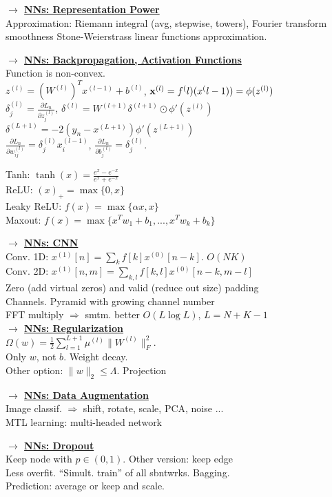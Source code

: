 \documentclass[]{article}
\newcommand{\myvector}[1]{{\bf{#1}}}
\newcommand{\x}{\myvector{x}}
\newcommand{\mytitle}[1]{ {\bf $\rightarrow$ \underline{#1}}\\}
\begin{document}
\begin{multicols*}{2}
\mytitle{NNs: Representation Power}
Approximation: Riemann integral (avg, stepwise, towers), Fourier transform smoothness
Stone-Weierstrass linear functions approximation.

\mytitle{NNs: Backpropagation, Activation Functions}
Function is non-convex.\\
$z^({l})=(W^{(l)})^Tx^{(l-1)}+b^{(l)}$, $\x^{(l)}=f^({l})(x^({l-1}))=\phi(z^{(l)})$\\
$\delta_j^{(l)}=\frac{\partial L_n}{\partial z_j^{(l)}}$, $\delta^{(l)}=W^{(l+1)}\delta^{(l+1)}\odot \phi'(z^{(l)})$\\
$\delta^{(L+1)}=-2(y_n-x^{(L+1)})\phi'(z^{(L+1)})$\\
$\frac{\partial L_n}{\partial w_{ij}^{(l)}}=\delta^{(l)}_jx_i^{(l-1)}$,
$\frac{\partial L_n}{\partial b_{j}^{(l)}}=\delta^{(l)}_j$.

Tanh: $\tanh(x)=\frac{e^x-e^{-x}}{e^x+e^{-x}}$\\
ReLU: $(x)_+=\max\{0, x\}$\\
Leaky ReLU: $f(x)=\max\{\alpha x, x\}$\\
Maxout: $f(x)=\max\{x^Tw_1+b_1,...,x^Tw_k+b_k\}$

\mytitle{NNs: CNN}
Conv. 1D: $x^{(1)}[n]=\sum\limits_kf[k]x^{(0)}[n-k]$. $O(NK)$\\
Conv. 2D: $x^{(1)}[n,m]=\sum\limits_{k,l}f[k,l]x^{(0)}[n-k,m-l]$\\
Zero (add virtual zeros) and valid (reduce out size) padding\\
Channels. Pyramid with growing channel number\\
FFT multiply $\Rightarrow$ smtm. better $O(L\log L)$, $L=N+K-1$\\

\mytitle{NNs: Regularization}
$\Omega(w)=\frac{1}{2}\sum\limits_{l=1}^{L+1}\mu^{(l)}\|W^{(l)}\|_F^2$.\\
Only $w$, not $b$. Weight decay.\\
Other option: $\|w\|_2\leqslant \Lambda$. Projection

\mytitle{NNs: Data Augmentation}
Image classif. $\Rightarrow$ shift, rotate, scale, PCA, noise ...\\
MTL learning: multi-headed network

\mytitle{NNs: Dropout}
Keep node with $p\in(0,1)$. Other version: keep edge\\
Less overfit. ``Simult. train'' of all sbntwrks. Bagging.\\
Prediction: average or keep and scale.


\end{multicols*}
\end{document}
